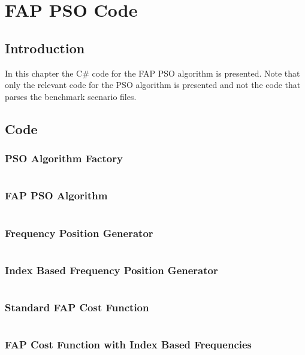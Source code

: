 \appendix
\label{chpt:apxFAPPSO}
\chapter{FAP PSO Code}
\section{Introduction}
In this chapter the C\# code for the FAP PSO algorithm is presented. Note that only the relevant code for the PSO algorithm is presented and not the code that parses the benchmark scenario files.
\section{Code}
\subsection{PSO Algorithm Factory}
\inputminted[fontsize=\tiny]{csharp}{../Implementation/PSOFAP/PSOFAPConsole/FAPPSO/FAPPSOFactory.cs}
\subsection{FAP PSO Algorithm}
\inputminted[fontsize=\tiny]{csharp}{../Implementation/PSOFAP/PSOFAPConsole/FAPPSO/FAPPSOAlgorithm.cs}
\subsection{Frequency Position Generator}
\inputminted[fontsize=\tiny]{csharp}{../Implementation/PSOFAP/PSOFAPConsole/FAPPSO/FrequencyPositionGenerator.cs}
\subsection{Index Based Frequency Position Generator}
\inputminted[fontsize=\tiny]{csharp}{../Implementation/PSOFAP/PSOFAPConsole/FAPPSO/FrequencyIndexPositionGenerator.cs}
\subsection{Standard FAP Cost Function}
\inputminted[fontsize=\tiny]{csharp}{../Implementation/PSOFAP/PSOFAPConsole/FAPPSO/FAPCostFunction.cs}
\subsection{FAP Cost Function with Index Based Frequencies}
\inputminted[fontsize=\tiny]{csharp}{../Implementation/PSOFAP/PSOFAPConsole/FAPPSO/FAPIndexCostFunction.cs}
